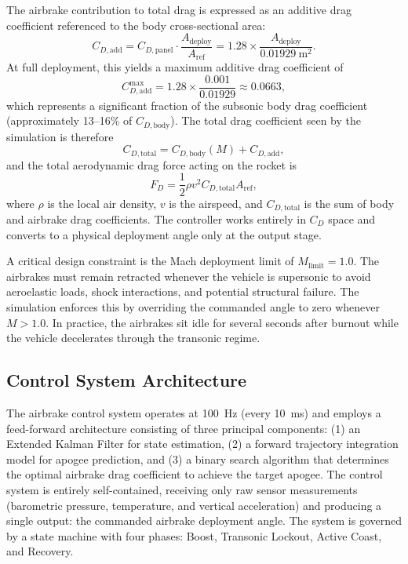 \documentclass[11pt,letterpaper]{article}
\newcommand{\Cd}{C_D}
\newcommand{\Cdadd}{C_{D,\mathrm{add}}}
\newcommand{\Cdbody}{C_{D,\mathrm{body}}}
\newcommand{\Cdtotal}{C_{D,\mathrm{total}}}
\newcommand{\Cdpanel}{C_{D,\mathrm{panel}}}
\newcommand{\Aref}{A_{\mathrm{ref}}}
\newcommand{\Adeploy}{A_{\mathrm{deploy}}}
\begin{document}
The airbrake contribution to total drag is expressed as an additive drag coefficient referenced to the body cross-sectional area:
\begin{equation}
    \Cdadd = \Cdpanel \cdot \frac{\Adeploy}{\Aref} = 1.28 \times \frac{\Adeploy}{\SI{0.01929}{\metre\squared}}.
    \label{eq:cd_add}
\end{equation}
At full deployment, this yields a maximum additive drag coefficient of
\begin{equation}
    \Cdadd^{\max} = 1.28 \times \frac{0.001}{0.01929} \approx 0.0663,
    \label{eq:cd_add_max}
\end{equation}
which represents a significant fraction of the subsonic body drag coefficient (approximately 13--16\% of $\Cdbody$). The total drag coefficient seen by the simulation is therefore
\begin{equation}
    \Cdtotal = \Cdbody(M) + \Cdadd,
    \label{eq:cd_total}
\end{equation}
and the total aerodynamic drag force acting on the rocket is
\begin{equation}
    F_D = \frac{1}{2} \rho v^2 \Cdtotal \Aref,
    \label{eq:drag_force}
\end{equation}
where $\rho$ is the local air density, $v$ is the airspeed, and $\Cdtotal$ is the sum of body and airbrake drag coefficients. The controller works entirely in $\Cd$ space and converts to a physical deployment angle only at the output stage.

A critical design constraint is the Mach deployment limit of $M_{\mathrm{limit}} = 1.0$. The airbrakes must remain retracted whenever the vehicle is supersonic to avoid aeroelastic loads, shock interactions, and potential structural failure. The simulation enforces this by overriding the commanded angle to zero whenever $M > 1.0$. In practice, the airbrakes sit idle for several seconds after burnout while the vehicle decelerates through the transonic regime.


\subsection{Control System Architecture}
\label{sec:control_arch}

The airbrake control system operates at \SI{100}{\hertz} (every \SI{10}{\milli\second}) and employs a feed-forward architecture consisting of three principal components: (1) an Extended Kalman Filter for state estimation, (2) a forward trajectory integration model for apogee prediction, and (3) a binary search algorithm that determines the optimal airbrake drag coefficient to achieve the target apogee. The control system is entirely self-contained, receiving only raw sensor measurements (barometric pressure, temperature, and vertical acceleration) and producing a single output: the commanded airbrake deployment angle. The system is governed by a state machine with four phases: Boost, Transonic Lockout, Active Coast, and Recovery.
\end{document}
